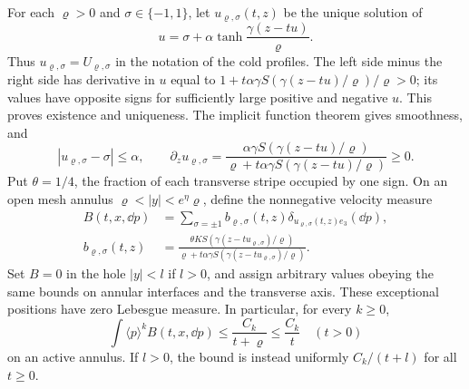For each \(\varrho>0\) and \(\sigma\in\{-1,1\}\), let
\(u_{\varrho,\sigma}(t,z)\) be the unique solution of
\[
u=\sigma+\alpha\tanh\frac{\gamma(z-tu)}\varrho.
\]
Thus \(u_{\varrho,\sigma}=U_{\varrho,\sigma}\) in the notation of the cold profiles. The left side minus the right side has derivative in \(u\) equal to
\(1+t\alpha\gamma S(\gamma(z-tu)/\varrho)/\varrho>0\); its values have
opposite signs for sufficiently large positive and negative \(u\).
This proves existence and uniqueness. The implicit function theorem
gives smoothness, and
\[
|u_{\varrho,\sigma}-\sigma|\leq\alpha,
\qquad
\partial_z u_{\varrho,\sigma}
=\frac{\alpha\gamma S(\gamma(z-tu)/\varrho)}
       {\varrho+t\alpha\gamma S(\gamma(z-tu)/\varrho)}\geq0.
\]
Put \(\theta=1/4\), the fraction of each transverse stripe occupied
by one sign. On an open mesh annulus \(\varrho<|y|<e^\eta\varrho\), define the
nonnegative velocity measure
\begin{equation}\label{eq:background}
\begin{split}
B(t,x,\dd p)
&=\sum_{\sigma=\pm1}b_{\varrho,\sigma}(t,z)
                         \delta_{u_{\varrho,\sigma}(t,z)e_3}(\dd p),\\
b_{\varrho,\sigma}(t,z)
&=\frac{\theta K S(\gamma(z-tu_{\varrho,\sigma})/\varrho)}
 {\varrho+t\alpha\gamma S(\gamma(z-tu_{\varrho,\sigma})/\varrho)}.
\end{split}
\end{equation}
Set \(B=0\) in the hole \(|y|<l\) if \(l>0\), and assign arbitrary
values obeying the same bounds on annular interfaces and the transverse
axis. These exceptional positions have zero Lebesgue measure. In
particular, for every \(k\geq0\),
\begin{equation}\label{dil:background-bound}
\int\langle p\rangle^kB(t,x,\dd p)
\leq\frac{C_k}{t+\varrho}\leq\frac{C_k}{t}
\quad(t>0)
\end{equation}
on an active annulus. If \(l>0\), the bound is instead uniformly
\(C_k/(t+l)\) for all \(t\geq0\).

